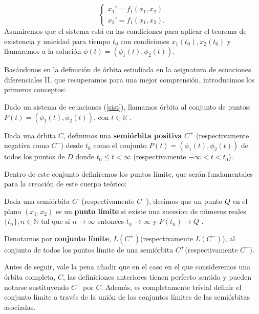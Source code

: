 \begin{equation} \left \{ \begin{matrix} x_1'=f_1(x_1,x_2)\\ x_2'=f_1(x_1,x_2).  \end{matrix}  \right.\label{sist}\end{equation}
Asumiremos que el sistema está en las condiciones para aplicar el teorema de existencia y unicidad para tiempo $t_0$ con condiciones $x_1(t_0) , x_2(t_0)$ y llamaremos a la solución $\phi(t)=(\phi_1(t),\phi_2(t))$.

 Basándonos en la definición de órbita estudiada en la asignatura de ecuaciones diferenciales II, que recuperamos para una mejor comprensión, introducimos los primeros conceptos:
  \begin{defi}[Órbita]
  	Dado un sistema de ecuaciones (\ref{sist}), llamamos órbita al conjunto de puntos:  $P(t)=(\phi_1(t),\phi_2(t))$, 
  	con $t\in \mathbb{R}$  .
  \end{defi}
  
 \begin{defi}[Semiórbita]
 	Dada una órbita $C$, definimos una \textbf{semiórbita positiva} $C^+$ (respectivamente negativa como $C^-$) desde $t_0$ como el conjunto $P(t)=(\phi_1(t),\phi_2(t))$ de todos los puntos de $D$ donde \(t_0\leq t < \infty\) (respectivamente \(-\infty< t < t_0\)).
 \end{defi}
 Dentro de este conjunto definiremos los puntos límite, que serán fundamentales para la creación de este cuerpo teórico:
 \begin{defi}
 	
 	Dada una semiórbita $C^+$(respectivamente $C^-$), decimos que un punto $Q$ en el plano \((x_1,x_2)\) es un \textbf{punto límite} si existe una sucesion de números reales \( \{t_n\}, n\in \mathbb{N}\) tal que si $n\rightarrow \infty$ entonces $t_n\rightarrow \infty$ y $P(t_n)\rightarrow Q$ .
 \end{defi}
 \begin{defi}
 	
 	Denotamos por\textbf{ conjunto límite}, $L(C^+)$(respectivamente $L(C^-)$), al conjunto de todos los puntos límite de una semiórbita $C^+$(respectivamente $C^-$).
 \end{defi}
 Antes de seguir, vale la pena añadir que en el caso en el que consideremos una órbita completa, $C$, las definiciones anteriores tienen perfecto sentido y pueden notarse sustituyendo $C^+$ por $C$. Además, es completamente trivial definir el conjunto límite a través de la unión de los conjuntos límites de las semiórbitas asociadas.\\
 
